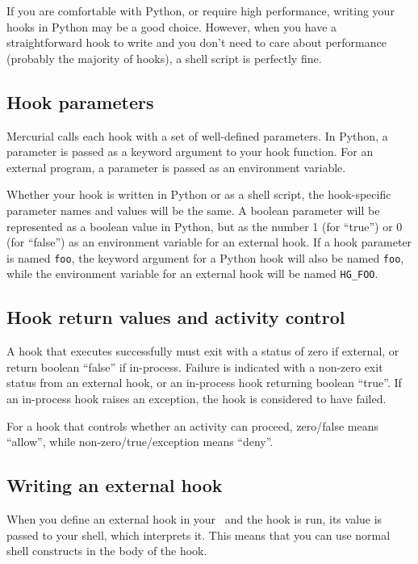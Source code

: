 If you are comfortable with Python, or require high performance,
writing your hooks in Python may be a good choice.  However, when you
have a straightforward hook to write and you don't need to care about
performance (probably the majority of hooks), a shell script is
perfectly fine.

\subsection{Hook parameters}
\label{sec:hook:param}

Mercurial calls each hook with a set of well-defined parameters.  In
Python, a parameter is passed as a keyword argument to your hook
function.  For an external program, a parameter is passed as an
environment variable.

Whether your hook is written in Python or as a shell script, the
hook-specific parameter names and values will be the same.  A boolean
parameter will be represented as a boolean value in Python, but as the
number 1 (for ``true'') or 0 (for ``false'') as an environment
variable for an external hook.  If a hook parameter is named
\texttt{foo}, the keyword argument for a Python hook will also be
named \texttt{foo}, while the environment variable for an external
hook will be named \texttt{HG\_FOO}.

\subsection{Hook return values and activity control}

A hook that executes successfully must exit with a status of zero if
external, or return boolean ``false'' if in-process.  Failure is
indicated with a non-zero exit status from an external hook, or an
in-process hook returning boolean ``true''.  If an in-process hook
raises an exception, the hook is considered to have failed.

For a hook that controls whether an activity can proceed, zero/false
means ``allow'', while non-zero/true/exception means ``deny''.

\subsection{Writing an external hook}

When you define an external hook in your \hgrc\ and the hook is run,
its value is passed to your shell, which interprets it.  This means
that you can use normal shell constructs in the body of the hook.

